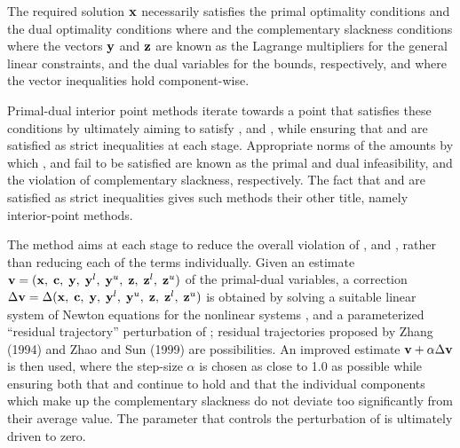 \documentclass{galahad}
\begin{document}

\galmethod
The required solution ${\mathbf{x}}$ necessarily satisfies
the primal optimality conditions
and
the dual optimality conditions
where
and the complementary slackness conditions
where the vectors ${\mathbf{y}}$ and ${\mathbf{z}}$ are known as the Lagrange multipliers for
the general linear constraints, and the dual variables for the bounds,
respectively, and where the vector inequalities hold component-wise.

Primal-dual interior point methods iterate towards a point
that satisfies these conditions by ultimately aiming to satisfy
,  and , while ensuring that
 and  are
satisfied as strict inequalities at each stage.
Appropriate norms of the amounts by
which ,  and  fail to be satisfied are known as the
primal and dual infeasibility, and the violation of complementary slackness,
respectively. The fact that  and  are satisfied as strict
inequalities gives such methods their other title, namely
interior-point methods.

The method aims at each stage to reduce the
overall violation of ,  and ,
rather than reducing each of the terms individually. Given an estimate
${\mathbf{v}} = ({\mathbf{x}}, \; {\mathbf{c}}, \; {\mathbf{y}}, \; {\mathbf{y}}^{l}, \;
{\mathbf{y}}^{u}, \; {\mathbf{z}}, \; {\mathbf{z}}^{l}, \; {\mathbf{z}}^{u})$
of the primal-dual variables, a correction
$\Delta {\mathbf{v}} = \Delta ({\mathbf{x}}, \; {\mathbf{c}}, \; {\mathbf{y}}, \; {\mathbf{y}}^{l},
 \; {\mathbf{y}}^{u} ,\;{\mathbf{z}},\;{\mathbf{z}}^{l} ,\;{\mathbf{z}}^{u} )$
is obtained by solving a suitable linear system of Newton equations for the
nonlinear systems ,  and a parameterized ``residual
trajectory'' perturbation of ; residual trajectories
proposed by Zhang (1994) and Zhao and Sun (1999) are possibilities.
An improved estimate ${\mathbf{v}} + \alpha \Delta {\mathbf{v}}$
is then used, where the step-size $\alpha$
is chosen as close to 1.0 as possible while ensuring both that
 and  continue to hold and that the individual components
which make up the complementary slackness
 do not deviate too significantly
from their average value. The parameter that controls the perturbation
of  is ultimately driven to zero.
\end{document}

